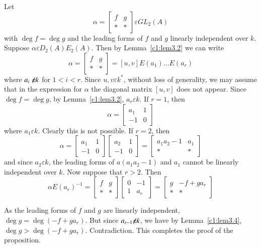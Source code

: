 \begin{prf}
Let 
$$
\alpha=
\begin{bmatrix}
f & g\\
\ast & \ast
\end{bmatrix} \varepsilon GL_2(A)
$$
with $\deg f=\deg g$ and the leading forms of $f$ and $g$ linearly
independent over $k$. Suppose $\alpha \varepsilon D_2(A) E_2(A)$. Then
by Lemma~\ref{c1:lem3.2} we can write
$$
\alpha=
\begin{bmatrix}
f & g\\
\ast & \ast
\end{bmatrix}= [u,v] E(a_1)\ldots E(a_r)
$$
where $a_i\not\kern-2pt\varepsilon k$ for $1<i<r$. Since $u, v \varepsilon k^{\ast}$,
without loss of generality, we may assume that in the expression for
$\alpha$ the diagonal matrix $[u, v]$ does not appear. Since $\deg
f=\deg g$, by Lemma~\ref{c1:lem3.2}, $a_r\varepsilon k$. If $r=1$, then 
$$
\alpha=
\begin{bmatrix}
a_1 & 1\\
-1 & 0
\end{bmatrix}
$$
where $a_1 \varepsilon k$. Clearly this is not possible. If $r=2$,
then 
$$
\alpha=
\begin{bmatrix}
a_1 & 1\\
-1 & 0
\end{bmatrix} \begin{bmatrix}
a_2 & 1\\
-1 & 0
\end{bmatrix} = \begin{bmatrix}
a_1a_2-1 & a_1\\
\ast & \ast
\end{bmatrix}
$$
and since $a_2 \varepsilon k$, the leading forms of $a(a_1a_2-1)$ and
$a_1$ cannot be linearly independent over $k$. Now suppose that
$r>2$. Then 
$$
\alpha E(a_r)^{-1}=
\begin{bmatrix}
f & g\\
\ast & \ast
\end{bmatrix} \begin{bmatrix}
0 & -1\\
1 & a_r
\end{bmatrix} = \begin{bmatrix}
g & -f+ga_r\\
\ast & \ast
\end{bmatrix}
$$

As the leading forms of $f$ and $g$ are linearly independent, $\deg g=
\deg(-f+ga_r)$. But since $a_{r-1} \mbox{$\not\kern-2pt\varepsilon$} k$, we have by
Lemma~\ref{c1:lem3.4}, $\deg g>\deg(-f+ga_r)$. Contradiction. This
completes the proof of the proposition.
\enprf
\end{prf}

